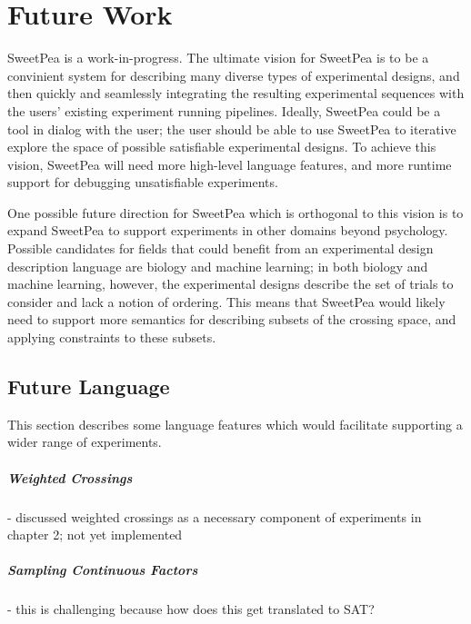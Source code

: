 \chapter{Future Work}

SweetPea is a work-in-progress. The ultimate vision for SweetPea is to be a convinient system for describing many diverse types of experimental designs, and then quickly and seamlessly integrating the resulting experimental sequences with the users' existing experiment running pipelines. Ideally, SweetPea could be a tool in dialog with the user; the user should be able to use SweetPea to iterative explore the space of possible satisfiable experimental designs. To achieve this vision, SweetPea will need more high-level language features, and more runtime support for debugging unsatisfiable experiments.

One possible future direction for SweetPea which is orthogonal to this vision is to expand SweetPea to support experiments in other domains beyond psychology. Possible candidates for fields that could benefit from an experimental design description language are biology and machine learning; in both biology and machine learning, however, the experimental designs describe the set of trials to consider and lack a notion of ordering. This means that SweetPea would likely need to support more semantics for describing subsets of the crossing space, and applying constraints to these subsets.

\section{Future Language}

This section describes some language features which would facilitate supporting a wider range of experiments.

\paragraph*{Weighted Crossings}

- discussed weighted crossings as a necessary component of experiments in chapter 2; not yet implemented


\paragraph*{Sampling Continuous Factors}

- this is challenging because how does this get translated to SAT?

